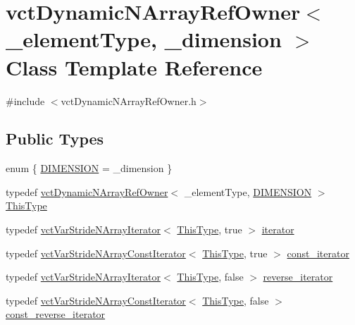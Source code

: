 \hypertarget{classvct_dynamic_n_array_ref_owner}{}\section{vct\+Dynamic\+N\+Array\+Ref\+Owner$<$ \+\_\+element\+Type, \+\_\+dimension $>$ Class Template Reference}
\label{classvct_dynamic_n_array_ref_owner}


{\ttfamily \#include $<$vct\+Dynamic\+N\+Array\+Ref\+Owner.\+h$>$}

\subsection*{Public Types}
\begin{DoxyCompactItemize}
\item 
enum \{ \hyperlink{classvct_dynamic_n_array_ref_owner_a80e01cf6b29f06f8909c10a950de8878a189e6a50792859079c88592f0c2ab19b}{D\+I\+M\+E\+N\+S\+I\+O\+N} = \+\_\+dimension
 \}
\item 
typedef \hyperlink{classvct_dynamic_n_array_ref_owner}{vct\+Dynamic\+N\+Array\+Ref\+Owner}$<$ \+\_\+element\+Type, \hyperlink{classvct_dynamic_n_array_ref_owner_a80e01cf6b29f06f8909c10a950de8878a189e6a50792859079c88592f0c2ab19b}{D\+I\+M\+E\+N\+S\+I\+O\+N} $>$ \hyperlink{classvct_dynamic_n_array_ref_owner_acd225aa6d3759b053ed4ab7ca6026989}{This\+Type}
\item 
typedef \hyperlink{classvct_var_stride_n_array_iterator}{vct\+Var\+Stride\+N\+Array\+Iterator}$<$ \hyperlink{classvct_dynamic_n_array_ref_owner_acd225aa6d3759b053ed4ab7ca6026989}{This\+Type}, true $>$ \hyperlink{classvct_dynamic_n_array_ref_owner_a9d68370074a5320a30354e700207ad71}{iterator}
\item 
typedef \hyperlink{classvct_var_stride_n_array_const_iterator}{vct\+Var\+Stride\+N\+Array\+Const\+Iterator}$<$ \hyperlink{classvct_dynamic_n_array_ref_owner_acd225aa6d3759b053ed4ab7ca6026989}{This\+Type}, true $>$ \hyperlink{classvct_dynamic_n_array_ref_owner_ab6652472746656a9be2de178295fd80b}{const\+\_\+iterator}
\item 
typedef \hyperlink{classvct_var_stride_n_array_iterator}{vct\+Var\+Stride\+N\+Array\+Iterator}$<$ \hyperlink{classvct_dynamic_n_array_ref_owner_acd225aa6d3759b053ed4ab7ca6026989}{This\+Type}, false $>$ \hyperlink{classvct_dynamic_n_array_ref_owner_aabd87b1efc3a18043c6dac3d8017be59}{reverse\+\_\+iterator}
\item 
typedef \hyperlink{classvct_var_stride_n_array_const_iterator}{vct\+Var\+Stride\+N\+Array\+Const\+Iterator}$<$ \hyperlink{classvct_dynamic_n_array_ref_owner_acd225aa6d3759b053ed4ab7ca6026989}{This\+Type}, false $>$ \hyperlink{classvct_dynamic_n_array_ref_owner_ade444e0883b2420a8a113171b6e49bf4}{const\+\_\+reverse\+\_\+iterator}
\end{DoxyCompactItemize}
